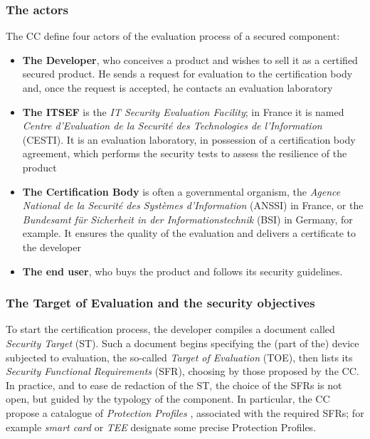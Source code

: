 \subsubsection{The actors} The CC define four actors of the evaluation process of a secured component:
\begin{itemize}
\item \textbf{The Developer}, who conceives a product and wishes to sell it as a certified secured product. He sends a request for evaluation to the certification body and, once the request is accepted, he contacts an evaluation laboratory
\item \textbf{The ITSEF} is the \emph{IT Security Evaluation Facility}; in France it is named \emph{Centre d'Evaluation de la Securit\'e des Technologies de l'Information} (CESTI). It is an evaluation laboratory, in possession of a certification body agreement, which performs the security tests to assess the resilience of the product
\item \textbf{The Certification Body} is often a governmental organism, the \emph{Agence National de la Securit\'e des Syst\`emes d'Information} (ANSSI) in France, or the \emph{Bundesamt f\"ur Sicherheit in der Informationstechnik} (BSI) in Germany, for example. It ensures the quality of the evaluation and delivers a certificate to the developer
\item \textbf{The end user}, who buys the product and follows its security guidelines.
\end{itemize} 

\subsubsection{The Target of Evaluation and the security objectives} 
To start the certification process, the developer compiles a document called \emph{Security Target} (ST). Such a document begins specifying the (part of the) device subjected to evaluation, the so-called \emph{Target of Evaluation} (TOE), then lists its \emph{Security Functional Requirements} (SFR), choosing by those proposed by the CC. In practice, and to ease de redaction of the ST, the choice of the SFRs is not open, but guided by the typology of the component. In particular, the CC propose a catalogue of \emph{Protection Profiles} , associated with the required SFRs; for example \emph{smart card} or \emph{TEE} designate some precise Protection Profiles. 

